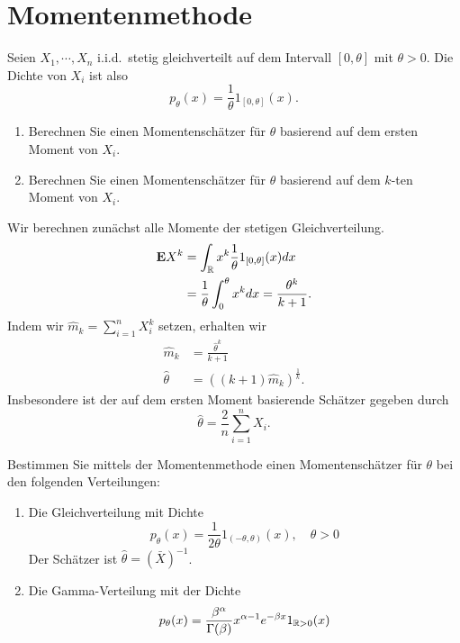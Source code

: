 \section{Momentenmethode}

 Seien $X_1, \cdots, X_n$ 
i.i.d.\ stetig gleichverteilt auf dem Intervall $[0,\theta]$ mit $\theta>0$. 
Die Dichte von $X_i$ ist also 
\begin{equation*}
    p_{\theta}(x) = \frac{1}{\theta} 1_{[0,\theta]}(x).
\end{equation*}
\begin{enumerate}
    \item Berechnen Sie einen Momentenschätzer für $\theta$ basierend auf dem 
        ersten Moment von $X_i$. 
    \item Berechnen Sie einen Momentenschätzer für $\theta$ basierend auf dem 
        $k$-ten Moment von $X_i$. 
\end{enumerate}

\solution Wir berechnen zunächst alle Momente der stetigen Gleichverteilung. 
\begin{align*}
    \mathbf{E} X^k &= \int_{\mathbb R} x^k \frac{1}{\theta} 1_{[0,\theta]} (x) dx \\
    &= \frac{1}{\theta} \int_{0}^\theta x^k dx = \frac{\theta^k}{k+1}. 
\end{align*}
Indem wir $\hat m_{k} = \sum_{i=1}^{n} X_i^k$ setzen, erhalten wir
\begin{align*}
    \hat m_k &= \frac{\hat\theta^k}{k+1} \\
    \hat \theta &= \left( (k+1) \hat m_k \right)^{\frac{1}{k}}.
\end{align*}
Insbesondere ist der auf dem ersten Moment basierende Schätzer gegeben durch
\begin{equation*}
    \hat \theta = \frac{2}{n} \sum_{i=1}^{n} X_i.
\end{equation*}



 Bestimmen Sie mittels der Momentenmethode
einen Momentenschätzer für $\theta$ bei den folgenden Verteilungen: 
\begin{enumerate}
	\item Die Gleichverteilung mit Dichte
		\begin{equation*}
			p_\theta(x) = \frac{1}{ 2\theta } 1_{(-\theta,\theta)}(x), \quad \theta>0
		\end{equation*}
		Der Schätzer ist $\hat \theta = \left( \bar X \right)^{-1}$.
	\item Die Gamma-Verteilung mit der Dichte 
		\begin{equation*}
			p_\theta(x) = \frac{\beta^\alpha}{ \Gamma(\beta)} x^{\alpha-1} e^{-\beta x}1_{\mathbb R>0}(x)
		\end{equation*}
\end{enumerate}

